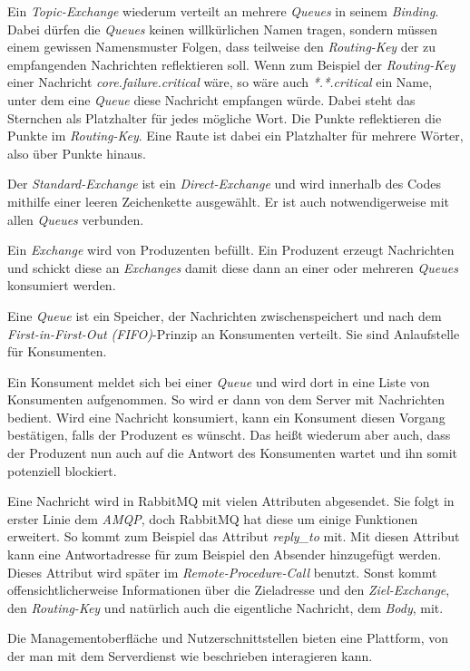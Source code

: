 \documentclass[12pt,a4paper]{scrartcl}
\begin{document}
Ein \emph{Topic-Exchange} wiederum verteilt an mehrere \emph{Queues} in seinem \emph{Binding}. Dabei dürfen die \emph{Queues} keinen willkürlichen Namen tragen, sondern müssen einem gewissen Namensmuster Folgen, dass teilweise den \emph{Routing-Key} der zu empfangenden Nachrichten reflektieren soll. Wenn zum Beispiel der \emph{Routing-Key} einer Nachricht \emph{core.failure.critical} wäre, so wäre auch \emph{*.*.critical} ein Name, unter dem eine \emph{Queue} diese Nachricht empfangen würde. Dabei steht das Sternchen als Platzhalter für jedes mögliche Wort. Die Punkte reflektieren die Punkte im \emph{Routing-Key}. Eine Raute ist dabei ein Platzhalter für mehrere Wörter, also über Punkte hinaus. 

Der \emph{Standard-Exchange} ist ein \emph{Direct-Exchange} und wird innerhalb des Codes mithilfe einer leeren Zeichenkette ausgewählt. Er ist auch notwendigerweise mit allen \emph{Queues} verbunden.

Ein \emph{Exchange} wird von Produzenten befüllt. Ein Produzent erzeugt Nachrichten und schickt diese an \emph{Exchanges} damit diese dann an einer oder mehreren \emph{Queues} konsumiert werden.

Eine \emph{Queue} ist ein Speicher, der Nachrichten zwischenspeichert und nach dem \emph{First-in-First-Out (FIFO)}-Prinzip an Konsumenten verteilt. Sie sind Anlaufstelle für Konsumenten. 

Ein Konsument meldet sich bei einer \emph{Queue} und wird dort in eine Liste von Konsumenten aufgenommen. So wird er dann von dem Server mit Nachrichten bedient. Wird eine Nachricht konsumiert, kann ein Konsument diesen Vorgang bestätigen, falls der Produzent es wünscht.\cite{rabAck} Das heißt wiederum aber auch, dass der Produzent nun auch auf die Antwort des Konsumenten wartet und ihn somit potenziell blockiert.

Eine Nachricht wird in RabbitMQ mit vielen Attributen abgesendet. Sie folgt in erster Linie dem \emph{AMQP}, doch RabbitMQ hat diese um einige Funktionen erweitert. So kommt zum Beispiel das Attribut \emph{reply\_to} mit. Mit diesen Attribut kann eine Antwortadresse für zum Beispiel den Absender hinzugefügt werden. Dieses Attribut wird später im \emph{Remote-Procedure-Call} benutzt. Sonst kommt offensichtlicherweise Informationen über die Zieladresse und den \emph{Ziel-Exchange}, den \emph{Routing-Key} und natürlich auch die eigentliche Nachricht, dem \emph{Body}, mit.

Die Managementoberfläche und Nutzerschnittstellen bieten eine Plattform, von der man mit dem Serverdienst wie beschrieben interagieren kann.
\end{document}
